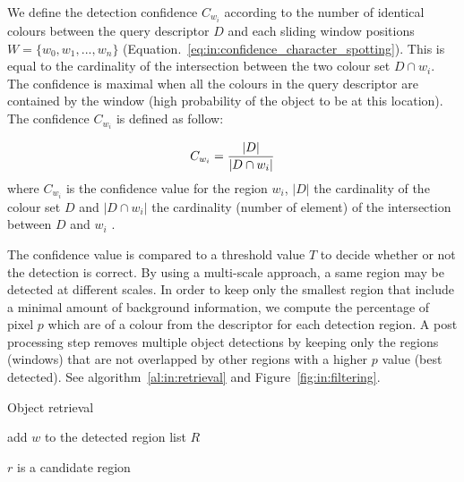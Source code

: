 We define the detection confidence $C_{w_i}$ according to the number of identical colours between the query descriptor $D$ and each sliding window positions $W=\{w_0,w_1,...,w_n\}$ (Equation.~\ref{eq:in:confidence_character_spotting}).
This is equal to the cardinality of the intersection between the two colour set $D \cap w_i$. The confidence is maximal when all the colours in the query descriptor are contained by the window (high probability of the object to be at this location).
The confidence $C_{w_i}$ is defined as follow:

\begin{equation}\label{eq:in:confidence_character_spotting}
   C_{w_i} = \frac{|D|}{|D \cap w_i|}\\
 \end{equation}
where $C_{w_i}$ is the confidence value for the region $w_i$, $|D|$ the cardinality of the colour set $D$ and $|D \cap w_i|$ the cardinality (number of element) of the intersection between $D$ and $w_i$ .

The confidence value is compared to a threshold value $T$ to decide whether or not the detection is correct. By using a multi-scale approach, a same region may be detected at different scales. In order to keep only the smallest region that include a minimal amount of background information, we compute the percentage of pixel $p$ which are of a colour from the descriptor for each detection region. 
A post processing step removes multiple object detections by keeping only the regions (windows) that are not overlapped by other regions with a higher $p$ value (best detected). See algorithm~\ref{al:in:retrieval} and Figure~\ref{fig:in:filtering}.

\begin{algorithm}
\caption{Object retrieval}
\label{al:in:retrieval}
\begin{algorithmic}
  
    
	\STATE add $w$ to the detected region list $R$
    \ENDIF  
  \ENDFOR
\ENDFOR

\STATE{}
	     \STATE $r$ is a candidate region
    \ENDIF
\ENDFOR
\end{algorithmic}
\end{algorithm}




